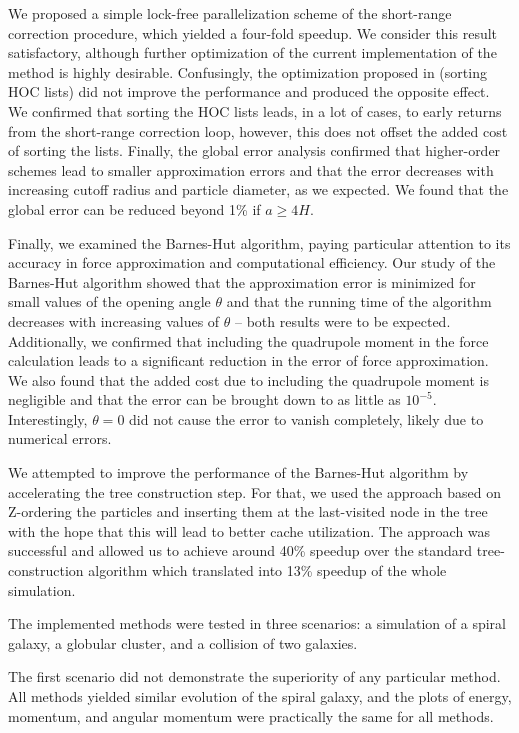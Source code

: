We proposed a simple lock-free parallelization scheme of the short-range correction procedure, which yielded a four-fold speedup.
We consider this result satisfactory, although further optimization of the current implementation of the \PThreeM{} method is highly desirable.
Confusingly, the optimization proposed in \cite{Hockney1988} (sorting HOC lists) did not improve the performance and produced the opposite effect.
We confirmed that sorting the HOC lists leads, in a lot of cases, to early returns from the short-range correction loop, however, this does not offset the added cost of sorting the lists.
Finally, the global error analysis confirmed that higher-order schemes lead to smaller approximation errors and that the error decreases with increasing cutoff radius and particle diameter, as we expected.
We found that the global error can be reduced beyond 1\% if $a \geq 4 H$.

Finally, we examined the Barnes-Hut algorithm, paying particular attention to its accuracy in force approximation and computational efficiency.
Our study of the Barnes-Hut algorithm showed that the approximation error is minimized for small values of the opening angle $\theta$ and that the running time of the algorithm decreases with increasing values of $\theta$ -- both results were to be expected.
Additionally, we confirmed that including the quadrupole moment in the force calculation leads to a significant reduction in the error of force approximation.
We also found that the added cost due to including the quadrupole moment is negligible and that the error can be brought down to as little as $10^{-5}$.
Interestingly, $\theta = 0$ did not cause the error to vanish completely, likely due to numerical errors.

We attempted to improve the performance of the Barnes-Hut algorithm by accelerating the tree construction step.
For that, we used the approach based on Z-ordering the particles and inserting them at the last-visited node in the tree with the hope that this will lead to better cache utilization.
The approach was successful and allowed us to achieve around 40\% speedup over the standard tree-construction algorithm which translated into 13\% speedup of the whole simulation.

The implemented methods were tested in three scenarios: a simulation of a spiral galaxy, a globular cluster, and a collision of two galaxies.

The first scenario did not demonstrate the superiority of any particular method.
All methods yielded similar evolution of the spiral galaxy, and the plots of energy, momentum, and angular momentum were practically the same for all methods.

